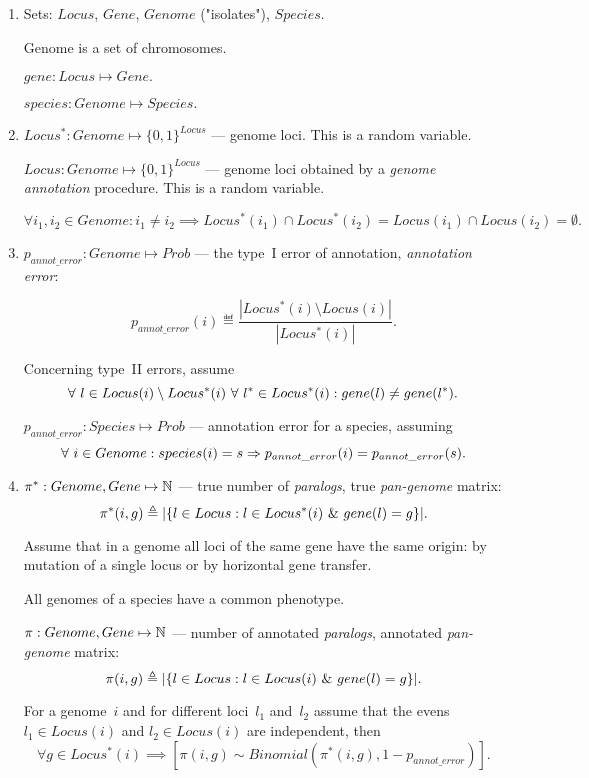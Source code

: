 \documentclass[10pt,a4paper]{article}
\theoremstyle{plain} \newtheorem{Lem}{Lemma}
\begin{document}
\begin{enumerate}

\item
Sets: $Locus$, $Gene$, $Genome$ ("isolates"), $Species$.

Genome is a set of chromosomes.

$ gene: Locus \mapsto Gene. $

$ species: Genome \mapsto Species. $


\item
$ Locus^*: Genome \mapsto \{0,1\}^{Locus}$ --- genome loci.
This is a random variable.

$ Locus: Genome \mapsto \{0,1\}^{Locus}$ --- genome loci obtained by a {\em genome annotation} procedure.
This is a random variable.

$$ \forall i_1, i_2 \in Genome : i_1 \ne i_2 \implies Locus^*(i_1) \cap Locus^*(i_2) = Locus(i_1) \cap Locus(i_2) = \emptyset. $$


\item
$p_{annot\_error}: Genome \mapsto Prob$ --- the type~I error of annotation, {\em annotation error}:

$$ p_{annot\_error}(i) \eqdef \frac{|Locus^*(i) \setminus Locus(i)|} {|Locus^*(i)|}. $$

Concerning type~II errors, assume
$$   \forall \  l \in Locus(i) \setminus Locus^*(i)
   \ \forall \  l^* \in Locus^*(i)
   : gene(l) \ne gene(l^*)
   .
$$

$p_{annot\_error}: Species \mapsto Prob$ --- annotation error for a species, assuming
$$ \forall \  i \in Genome: species(i) = s \Rightarrow p_{annot\_error}(i) = p_{annot\_error}(s). $$

\item
$\pi^*: Genome, Gene \mapsto \mathbb N$ --- true number of {\em paralogs}, true {\em pan-genome} matrix:
$$\pi^* (i,g) \triangleq |\{l \in Locus: l \in Locus^*(i) \ \& \  gene(l) = g\}|. $$

Assume that in a genome all loci of the same gene have the same origin: by mutation of a single locus or by horizontal gene transfer.

All genomes of a species have a common phenotype.


$\pi: Genome, Gene \mapsto \mathbb N$ --- number of annotated {\em paralogs}, annotated {\em pan-genome} matrix:
$$\pi (i,g) \triangleq |\{l \in Locus: l \in Locus(i) \ \& \  gene(l) = g\}|. $$


For a genome~$i$ and for different loci~$l_1$ and~$l_2$ assume
that the evens $l_1 \in Locus(i)$ and $l_2 \in Locus(i)$ are independent,
then
$$ \forall g \in Locus^*(i) \implies [\pi(i,g) \sim Binomial(\pi^*(i,g), 1 - p_{annot\_error})]. $$



\end{enumerate}
\end{document}
